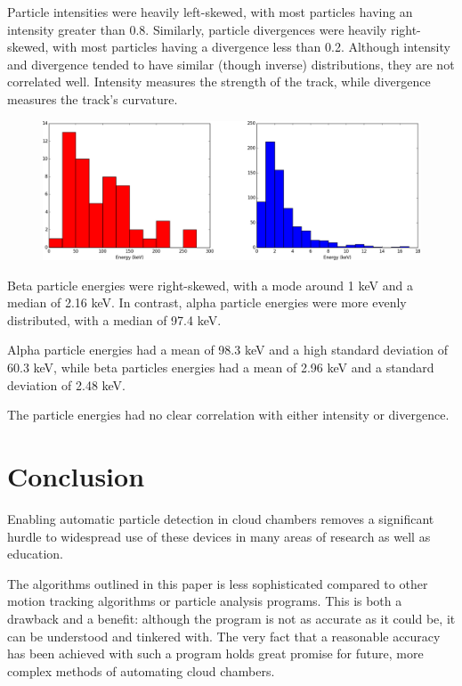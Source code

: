 \documentclass[notitlepage,12pt]{article}
\begin{document}
Particle intensities were heavily left-skewed, with most particles having an intensity greater than 0.8.  Similarly, particle divergences were heavily right-skewed, with most particles having a divergence less than 0.2.  Although intensity and divergence tended to have similar (though inverse) distributions, they are not correlated well.  Intensity measures the strength of the track, while divergence measures the track's curvature.

\begin{figure}[h!]
	\centering
	\includegraphics[width=\textwidth]{energies}
\end{figure}

Beta particle energies were right-skewed, with a mode around 1 keV and a median of 2.16 keV.  In contrast, alpha particle energies were more evenly distributed, with a median of 97.4 keV.

Alpha particle energies had a mean of 98.3 keV and a high standard deviation of 60.3 keV, while beta particles energies had a mean of 2.96 keV and a standard deviation of 2.48 keV.

The particle energies had no clear correlation with either intensity or divergence.

\section{Conclusion}

Enabling automatic particle detection in cloud chambers removes a significant hurdle to widespread use of these devices in many areas of research as well as education.
  
The algorithms outlined in this paper is less sophisticated compared to other motion tracking algorithms or particle analysis programs.  This is both a drawback and a benefit: although the program is not as accurate as it could be, it can be understood and tinkered with.  The very fact that a reasonable accuracy has been achieved with such a program holds great promise for future, more complex methods of automating cloud chambers. 
\end{document}
